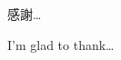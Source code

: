 \begin{acknowledgementszh}
感謝\ldots
\end{acknowledgementszh}

\begin{acknowledgementsen}
I'm glad to thank\ldots 
\end{acknowledgementsen}
